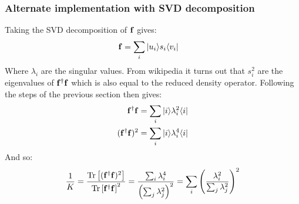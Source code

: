 \subsubsection{Alternate implementation with SVD decomposition} \label{svdAppendix}
Taking the SVD decomposition of ${\bf f}$ gives:
\begin{align}
{\bf f}&=\sum_{i}|u_i\rangle s_i\langle v_i|
\end{align}
Where $\lambda_i$ are the singular values. From wikipedia it turns out that $s_i^2$ are the eigenvalues of  ${\bf f}^{\dagger}{\bf f}$ which is also equal to the reduced density operator. Following the steps of the previous section then gives:
\begin{align}
{\bf f}^{\dagger}{\bf f}&=\sum_{i}|i\rangle \lambda^2_i\langle i|\\
({\bf f}^{\dagger}{\bf f})^2&=\sum_{i}|i\rangle \lambda^4_i\langle i|
\end{align}
And so:
\begin{align}
\frac{1}{K}=\frac{\operatorname{Tr}\left [({\bf f}^{\dagger}{\bf f})^2 \right ]}{\operatorname{Tr}\left [{\bf f}^{\dagger}{\bf f} \right ]^2}=\frac{\sum_{i}\lambda^4_i}{\left ( \sum_{j}\lambda^2_j \right )^2}=\sum_{i}\left (\frac{\lambda^2_i}{ \sum_{j}\lambda_j^2 }\right )^2
\end{align}